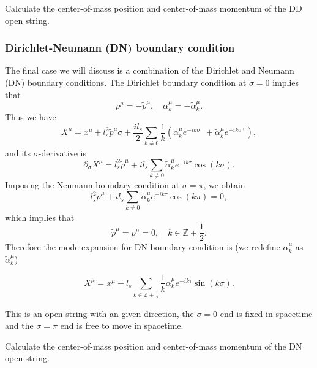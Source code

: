 \documentclass[graybox,envcountchap,sectrefs]{svmono}
\begin{document}
\begin{exercise}
Calculate the center-of-mass position and center-of-mass momentum of the DD open string. 	
\end{exercise}


\subsubsection*{Dirichlet-Neumann (DN) boundary condition}
The final case we will discuss is a combination of the Dirichlet and Neumann (DN) boundary conditions.
The Dirichlet boundary condition at $\sigma=0$ implies that
\begin{equation}
p^{\mu}=-\tilde{p}^{\mu}	, \quad \alpha_k^{\mu}=-\tilde{\alpha}_k^{\mu}.
\end{equation}
Thus we have
\begin{equation}
	X^{\mu}=x^{\mu}+l_s^2\tilde{p}^{\mu}\sigma+\frac{il_s}{2}\sum_{k\neq 0}\frac{1}{k}(\alpha_k^{\mu}e^{-ik\sigma^-}+\tilde{\alpha}^{\mu}_ke^{-ik\sigma^+} ),
\end{equation}
and its $\sigma$-derivative is
\begin{equation}
\partial_{\sigma}X^{\mu}=l_s^2\tilde{p}^{\mu}+{il_s}\sum_{k\neq 0}\tilde{\alpha}_k^{\mu}e^{-ik\tau}\cos (k\sigma)	.
\end{equation}
Imposing the Neumann boundary condition at $\sigma=\pi$, we obtain
\begin{equation}
l_s^2\tilde{p}^{\mu}+{il_s}\sum_{k\neq 0}\tilde{\alpha}_k^{\mu}e^{-ik\tau}\cos (k\pi)=0,	
\end{equation}
which implies that
\begin{equation}
\tilde{p}^{\mu}=p^{\mu}=0, \quad 	k\in \mathbb{Z}+\frac{1}{2}.
\end{equation}
Therefore the mode expansion for DN boundary condition is (we redefine $\alpha_k^{\mu}$ as $\tilde{\alpha}^{\mu}_k$)
\begin{svgraybox}
\begin{equation}
X^{\mu}=x^{\mu}+l_s\sum_{k\in \mathbb{Z}+\frac{1}{2}}\frac{1}{k}\alpha_k^{\mu}e^{-ik\tau}\sin (k\sigma).
\end{equation}	
\end{svgraybox}
This is an open string with an given direction, the $\sigma=0$ end is fixed in spacetime and the $\sigma=\pi$ end is free to move in spacetime. 
\begin{exercise}
Calculate the center-of-mass position and center-of-mass momentum of the DN open string. 	
\end{exercise}
\end{document}
